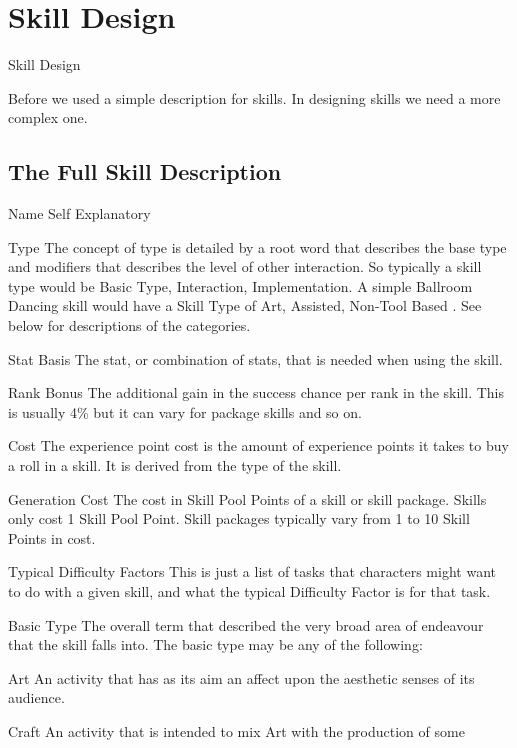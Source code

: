 \chapter{Skill Design}
{Skill Design}

Before we used a simple description for skills. In designing skills we need
a more complex one.

\section{The Full Skill Description}
\small

\begin{relate}
	\item[Name] Self Explanatory
	\item[Type] The concept of type is detailed by a root word that describes the base
	type and modifiers that describes the level of other interaction. So
	typically a skill type would be Basic Type, Interaction, Implementation.
	A simple Ballroom Dancing skill would have a Skill Type of
	Art, Assisted, Non-Tool Based . See below for descriptions of the
	categories.
	\item[Stat Basis] The stat, or combination of stats, that is needed
	when using the skill.
	\item[Rank Bonus] The additional gain in the success chance per rank
	in the skill. This is usually 4\% but it can vary for package skills
	and so on.
	\item[Cost]	The experience point cost is the amount of experience points it takes to
	buy a roll in a skill. It is derived from the type of the skill.
	\item[Generation Cost]
	The cost in Skill Pool Points of a skill or skill package. Skills
	only cost 1 Skill Pool Point. Skill packages typically vary from 1
	to 10 Skill Points in cost.
	\item[Typical Difficulty Factors]
	This is just a list of tasks that characters might want to do with a
	given skill, and what the typical Difficulty Factor is for that task.
	\item[Basic Type]
	The overall term that described the very broad area of
	endeavour that the skill falls into. The basic type may be any of the 
	following:
	\begin{relate}
		\item[Art]
		An activity that has as its aim an affect upon the aesthetic senses of its
		audience.
		\item[Craft]
		An activity that is intended to mix Art with the production of some

\end{relate}
\end{relate}
